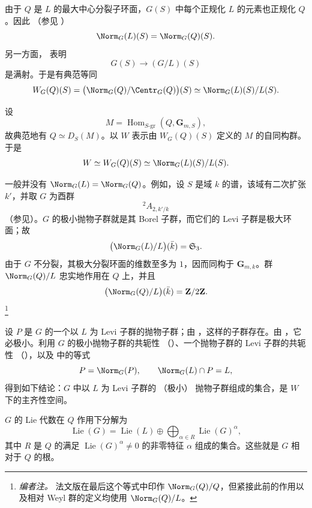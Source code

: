 
由于 \(Q\) 是 \(L\) 的最大中心分裂子环面，\(G(S)\) 中每个正规化 \(L\) 的元素也正规化 \(Q\)。因此 \textup{（参见 ）}
\[
 \Norm_G(L)(S)=\Norm_G(Q)(S).
\]
另一方面， 表明
\[
 G(S)\longrightarrow(G/L)(S)
\]
是满射。于是有典范等同
\[
 W_G(Q)(S)
 =\bigl(\Norm_G(Q)/\Centr_G(Q)\bigr)(S)
 \simeq\Norm_G(L)(S)/L(S).
\]

设
\[
 M=\operatorname{Hom}_{S\text{-}\mathrm{gr}}
      (Q,\mathbf G_{m,S}),
\]
故典范地有 \(Q\simeq D_S(M)\)。以 \(W\) 表示由 \(W_G(Q)(S)\) 定义的 \(M\) 的自同构群。于是
\[
 W\simeq W_G(Q)(S)\simeq\Norm_G(L)(S)/L(S).
\]


一般并没有 \(\Norm_G(L)=\Norm_G(Q)\)。例如，设 \(S\) 是域 \(k\) 的谱，该域有二次扩张 \(k'\)，并取 \(G\) 为酉群
\[
 {}^2\!A_{2,k'/k}
\]
\textup{（参见）}。\(G\) 的极小抛物子群就是其 Borel 子群，而它们的 Levi 子群是极大环面；故
\[
 \bigl(\Norm_G(L)/L\bigr)(\bar k)=\mathfrak S_3.
\]
由于 \(G\) 不分裂，其极大分裂环面的维数至多为 \(1\)，因而同构于 \(\mathbf G_{m,k}\)。群 \(\Norm_G(Q)/L\) 忠实地作用在 \(Q\) 上，并且
\[
 \bigl(\Norm_G(Q)/L\bigr)(\bar k)=\mathbf Z/2\mathbf Z.
\]
\footnote{\emph{编者注。} 法文版在最后这个等式中印作 \(\Norm_G(Q)/Q\)，但紧接此前的作用以及相对 Weyl 群的定义均使用 \(\Norm_G(Q)/L\)。}


设 \(P\) 是 \(G\) 的一个以 \(L\) 为 Levi 子群的抛物子群；由 ，这样的子群存在。由 ，它必极小。利用 \(G\) 的极小抛物子群的共轭性 \textup{（）}、一个抛物子群的 Levi 子群的共轭性 \textup{（）}，以及  中的等式
\[
 P=\Norm_G(P),\qquad \Norm_G(L)\cap P=L,
\]
得到如下结论：\(G\) 中以 \(L\) 为 Levi 子群的 \textup{（极小）} 抛物子群组成的集合，是 \(W\) 下的主齐性空间。


\(G\) 的 Lie 代数在 \(Q\) 作用下分解为
\[
 \operatorname{Lie}(G)
 =\operatorname{Lie}(L)
  \oplus\bigoplus_{\alpha\in R}\operatorname{Lie}(G)^\alpha,
\]
其中 \(R\) 是 \(Q\) 的满足 \(\operatorname{Lie}(G)^\alpha\ne0\) 的非零特征 \(\alpha\) 组成的集合。这些就是 \(G\) 相对于 \(Q\) 的根。

